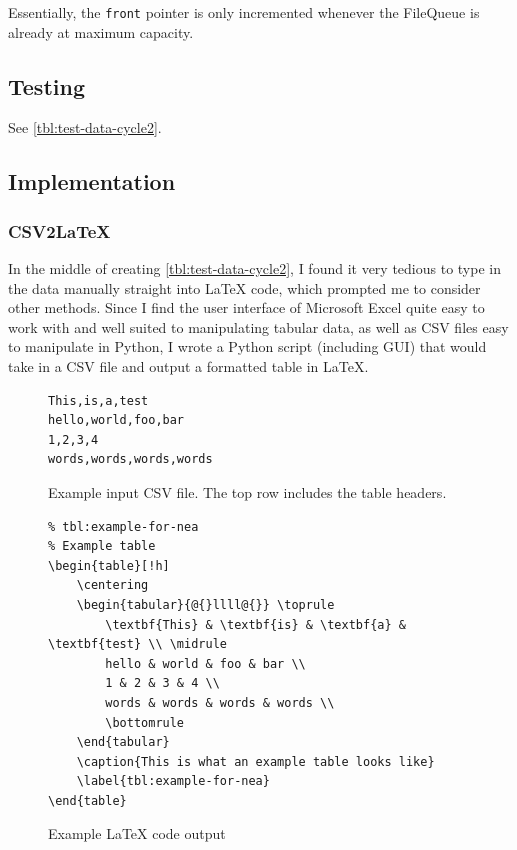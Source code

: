 \documentclass[11pt]{article}
\begin{document}
                Essentially, the \verb|front| pointer is only incremented whenever the FileQueue is already at maximum capacity.

        \newpage
        \subsection{Testing}
            See \autoref{tbl:test-data-cycle2}.

        \subsection{Implementation}
            \subsubsection{CSV2LaTeX}
                In the middle of creating \autoref{tbl:test-data-cycle2}, I found it very tedious to type in the data manually straight into LaTeX code, which prompted me to consider other methods. 
                Since I find the user interface of Microsoft Excel quite easy to work with and well suited to manipulating tabular data, as well as CSV files easy to manipulate in Python, I wrote a Python script (including GUI) that would take in a CSV file and output a formatted table in LaTeX. 

                \begin{figure}[!h]
                    \begin{verbatim}
This,is,a,test
hello,world,foo,bar
1,2,3,4
words,words,words,words
                    \end{verbatim}
                    \caption{Example input CSV file. The top row includes the table headers.}
                    \label{pc:csv2latex-example-input-csv}
                \end{figure}


                \begin{figure}[!h]
                    \begin{verbatim}
% tbl:example-for-nea
% Example table
\begin{table}[!h]
    \centering
    \begin{tabular}{@{}llll@{}} \toprule
        \textbf{This} & \textbf{is} & \textbf{a} & \textbf{test} \\ \midrule 
        hello & world & foo & bar \\ 
        1 & 2 & 3 & 4 \\ 
        words & words & words & words \\ 
        \bottomrule
    \end{tabular}
    \caption{This is what an example table looks like}
    \label{tbl:example-for-nea}
\end{table}
                    \end{verbatim}
                    \caption{Example LaTeX code output}
                    \label{pc:csv2latex-example-output-latex}
                \end{figure}
\end{document}

